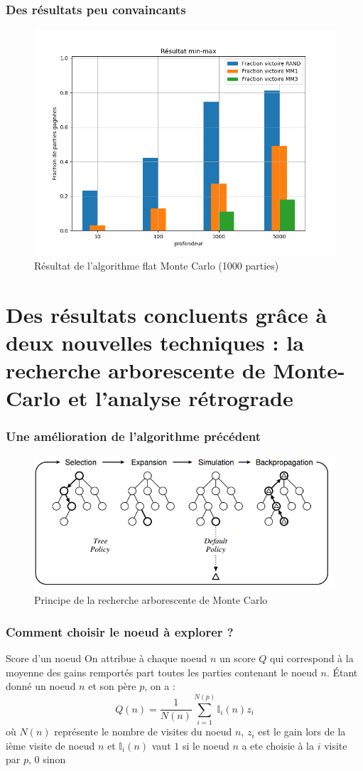 \message{ !name(test.tex)}\documentclass{beamer}
\begin{document}
\begin{frame}
  \frametitle{Des résultats peu convaincants}
  \begin{figure}
    \centering
    \includegraphics[width=0.75\linewidth]{ressources/resultat_flat_monte_carlo.png}
    \caption{Résultat de l'algorithme flat Monte Carlo (1000 parties)}
  \end{figure}
\end{frame}

\section{Des résultats concluents grâce à deux nouvelles techniques : la recherche arborescente de Monte-Carlo et l'analyse rétrograde}
\begin{frame}
  \frametitle{Une amélioration de l'algorithme précédent}
  \begin{figure}
    \centering
    \includegraphics[width=\linewidth]{ressources/monte_carlo_explication.png}
    \caption{Principe de la recherche arborescente de Monte Carlo}
  \end{figure}
\end{frame}

\begin{frame}
  \frametitle{Comment choisir le noeud à explorer ?}
  \begin{block}{Score d'un noeud}
On attribue à chaque noeud $n$ un score $Q$ qui correspond à la moyenne des gains remportés part toutes les parties contenant le noeud $n$. Étant donné un noeud $n$ et son père $p$, on a :
$$ Q(n) = \frac 1 {N(n)} \sum_{i=1}^{N(p)}\mathbb I_i(n)z_i $$
où $N(n)$ représente le nombre de visites du noeud $n$, $z_i$ est le gain lors de la ième visite de noeud $n$ et $\mathbb I_i(n)$ vaut $1$ si le noeud $n$ a ete choisie à la $i$ visite par $p$, 0 sinon
  \end{block}
\end{frame}
\end{document}

